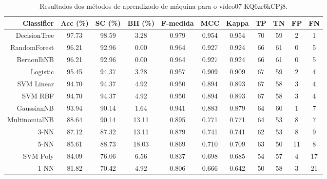 \begin{table}[!htb]
\centering
\caption{Resultados dos métodos de aprendizado de máquina para o vídeo07-KQ6zr6kCPj8.}
\label{tab:07-KQ6zr6kCPj8}
\begin{tabular}{r|c|c|c|c|c|c|c|c|c|c}
\hline\hline
Classifier & Acc (\%) & SC (\%) & BH (\%) & F-medida & MCC & Kappa & TP & TN & FP & FN \\ \hline
DecisionTree & 97.73 & 98.59 & 3.28 & 0.979 & 0.954 & 0.954 & 70 & 59 & 2 & 1 \\ 
RandomForest & 96.21 & 92.96 & 0.00 & 0.964 & 0.927 & 0.924 & 66 & 61 & 0 & 5 \\ 
BernoulliNB & 96.21 & 92.96 & 0.00 & 0.964 & 0.927 & 0.924 & 66 & 61 & 0 & 5 \\ 
Logistic & 95.45 & 94.37 & 3.28 & 0.957 & 0.909 & 0.909 & 67 & 59 & 2 & 4 \\ 
SVM Linear & 94.70 & 94.37 & 4.92 & 0.950 & 0.894 & 0.893 & 67 & 58 & 3 & 4 \\ 
SVM RBF & 94.70 & 94.37 & 4.92 & 0.950 & 0.894 & 0.893 & 67 & 58 & 3 & 4 \\ 
GaussianNB & 93.94 & 90.14 & 1.64 & 0.941 & 0.883 & 0.879 & 64 & 60 & 1 & 7 \\ 
MultinomialNB & 88.64 & 90.14 & 13.11 & 0.895 & 0.771 & 0.771 & 64 & 53 & 8 & 7 \\ 
3-NN & 87.12 & 87.32 & 13.11 & 0.879 & 0.741 & 0.741 & 62 & 53 & 8 & 9 \\ 
5-NN & 85.61 & 88.73 & 18.03 & 0.869 & 0.710 & 0.709 & 63 & 50 & 11 & 8 \\ 
SVM Poly & 84.09 & 76.06 & 6.56 & 0.837 & 0.698 & 0.685 & 54 & 57 & 4 & 17 \\ 
1-NN & 81.82 & 70.42 & 4.92 & 0.806 & 0.666 & 0.642 & 50 & 58 & 3 & 21 \\ 
\hline\hline
\end{tabular}
\end{table}
